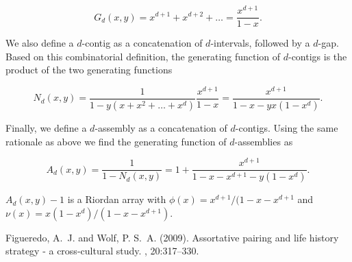 \documentclass{article}
\begin{document}
\begin{equation*}
G_d(x,y) = x^{d+1}+x^{d+2}+\ldots = \frac{x^{d+1}}{1-x}.
\end{equation*}

We also define a $d$-contig as a concatenation of $d$-intervals, followed
by a $d$-gap. Based on this combinatorial definition, the generating
function of $d$-contigs is the product of the two generating functions

\begin{equation*}
N_d(x,y) = \frac{1}{1-y(x+x^2+\ldots+x^d)}\frac{x^{d+1}}{1-x} =
\frac{x^{d+1}}{1-x-yx(1-x^d)}.
\end{equation*}

Finally, we define a $d$-assembly as a concatenation of $d$-contigs.
Using the same rationale as above we find the generating function of
$d$-assemblies as

\begin{equation*}
A_d(x,y) = \frac{1}{1-N_d(x,y)} =
1+\frac{x^{d+1}}{1-x-x^{d+1}-y(1-x^d)}.
\end{equation*}

$A_d(x,y)-1$ is a Riordan array with $\phi(x) =
x^{d+1}/(1-x-x^{d+1}$ and $\nu(x) = x(1-x^d)/(1-x-x^{d+1})$.


\begin{thebibliography}{99}

Figueredo, A.~J. and Wolf, P. S.~A. (2009).
\newblock Assortative pairing and life history strategy - a cross-cultural
  study.
, 20:317--330.
 
\end{thebibliography}

\end{document}
